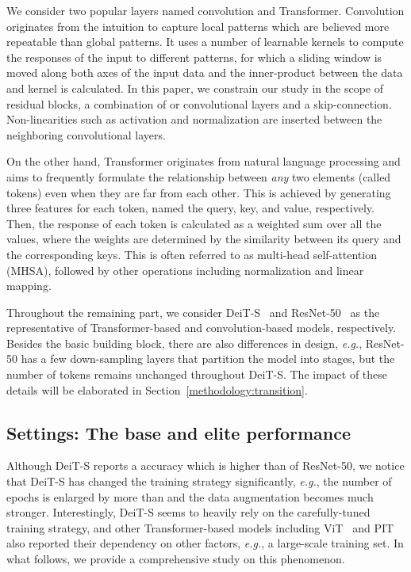 \documentclass[10pt,twocolumn,letterpaper]{article}
\begin{document}
We consider two popular layers named convolution and Transformer. Convolution originates from the intuition to capture local patterns which are believed more repeatable than global patterns. It uses a number of learnable kernels to compute the responses of the input to different patterns, for which a sliding window is moved along both axes of the input data and the inner-product between the data and kernel is calculated. In this paper, we constrain our study in the scope of residual blocks, a combination of  or  convolutional layers and a skip-connection. Non-linearities such as activation and normalization are inserted between the neighboring convolutional layers. 


On the other hand, Transformer originates from natural language processing and aims to frequently formulate the relationship between \textit{any} two elements (called tokens) even when they are far from each other. This is achieved by generating three features for each token, named the query, key, and value, respectively. Then, the response of each token is calculated as a weighted sum over all the values, where the weights are determined by the similarity between its query and the corresponding keys. This is often referred to as multi-head self-attention (MHSA), followed by other operations including normalization and linear mapping.


Throughout the remaining part, we consider DeiT-S~\cite{touvron2020training} and ResNet-50~\cite{he2016deep} as the representative of Transformer-based and convolution-based models, respectively. Besides the basic building block, there are also differences in design, \textit{e.g.}, ResNet-50 has a few down-sampling layers that partition the model into stages, but the number of tokens remains unchanged throughout DeiT-S. The impact of these details will be elaborated in Section~\ref{methodology:transition}.

\subsection{Settings: The base and elite performance}
\label{methodology:settings}

Although DeiT-S reports a  accuracy which is higher than  of ResNet-50, we notice that DeiT-S has changed the training strategy significantly, \textit{e.g.}, the number of epochs is enlarged by more than  and the data augmentation becomes much stronger. Interestingly, DeiT-S seems to heavily rely on the carefully-tuned training strategy, and other Transformer-based models including ViT~\cite{dosovitskiy2020image} and PIT~\cite{chen2020pre} also reported their dependency on other factors, \textit{e.g.}, a large-scale training set. In what follows, we provide a comprehensive study on this phenomenon.
\end{document}
